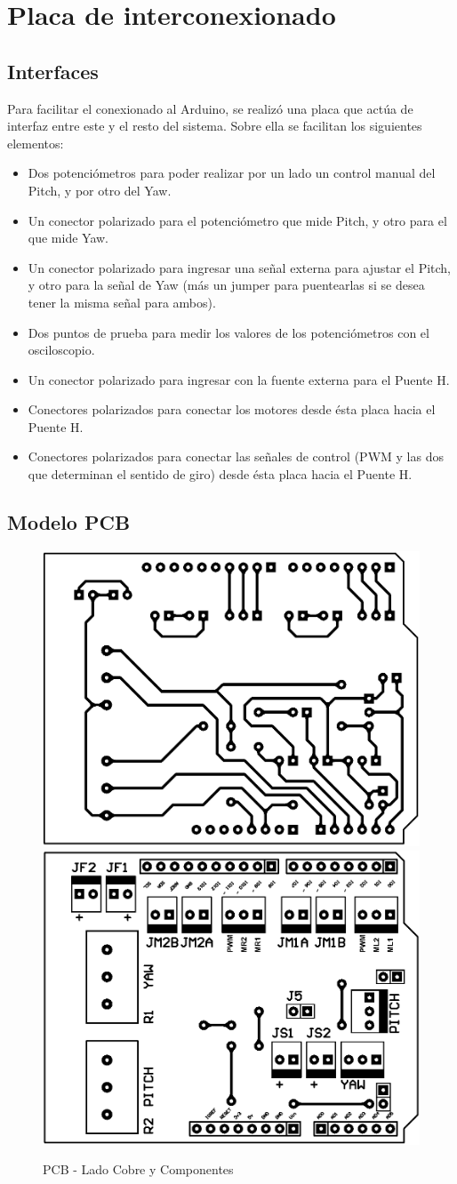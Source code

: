 \documentclass{article}
\begin{document}
\newpage

\section{Placa de interconexionado}

\subsection{Interfaces}

Para facilitar el conexionado al Arduino, se realizó una placa que actúa de interfaz entre este y el resto del sistema. Sobre ella se facilitan los siguientes elementos:

\begin{itemize}
\item Dos potenciómetros para poder realizar por un lado un control manual del Pitch, y por otro del Yaw.
\item Un conector polarizado para el potenciómetro que mide Pitch, y otro para el que mide Yaw.
\item Un conector polarizado para ingresar una señal externa para ajustar el Pitch, y otro para la señal de Yaw (más un jumper para puentearlas si se desea tener la misma señal para ambos).
\item Dos puntos de prueba para medir los valores de los potenciómetros con el osciloscopio.
\item Un conector polarizado para ingresar con la fuente externa para el Puente H.
\item Conectores polarizados para conectar los motores desde ésta placa hacia el Puente H.
\item Conectores polarizados para conectar las señales de control (PWM y las dos que determinan el sentido de giro) desde ésta placa hacia el Puente H.
\end{itemize}

\subsection{Modelo PCB}

\begin{figure}[H]
\centering
\includegraphics[width=0.4\linewidth]{images/cobre.png}
\includegraphics[width=0.4\linewidth]{images/componentes.png}\caption{PCB - Lado Cobre y Componentes}
\end{figure}
\end{document}

